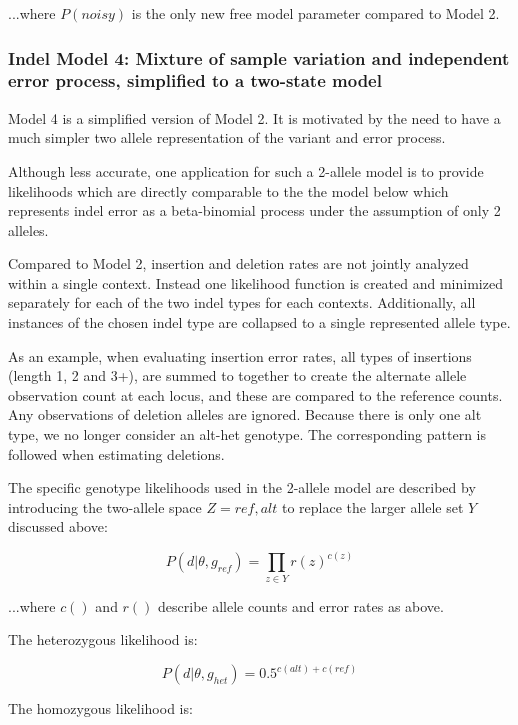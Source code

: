 \documentclass{article}
\begin{document}
...where $P(noisy)$ is the only new free model parameter compared to Model 2.


\subsubsection{Indel Model 4: Mixture of sample variation and independent error process, simplified to a two-state model}

Model 4 is a simplified version of Model 2. It is motivated by the need to have a much simpler two allele representation of the variant and error process.

Although less accurate, one application for such a 2-allele model is to provide likelihoods which are directly comparable to the the model below which represents indel error as a beta-binomial process under the assumption of only 2 alleles.

Compared to Model 2, insertion and deletion rates are not jointly analyzed within a single context. Instead one likelihood function is created and minimized separately for each of the two indel types for each contexts. Additionally, all instances of the chosen indel type are collapsed to a single represented allele type.

As an example, when evaluating insertion error rates, all types of insertions (length 1, 2 and 3+), are summed to together to create the alternate allele observation count at each locus, and these are compared to the reference counts. Any observations of deletion alleles are ignored. Because there is only one alt type, we no longer consider an alt-het genotype. The corresponding pattern is followed when estimating deletions.

The specific genotype likelihoods used in the 2-allele model are described by introducing the two-allele space $Z = {ref,alt}$ to replace the larger allele set $Y$ discussed above:

\begin{equation*}
P ( d \vert \theta, g_{ref}) = \prod_{z \in Y} r(z)^{c(z)}
\end{equation*}

...where $c()$ and $r()$ describe allele counts and error rates as above.

The heterozygous likelihood is:

\begin{equation*}
P (d \vert \theta, g_{het}) = 0.5^{c(alt) + c(ref)}
\end{equation*}

The homozygous likelihood is:
\end{document}
